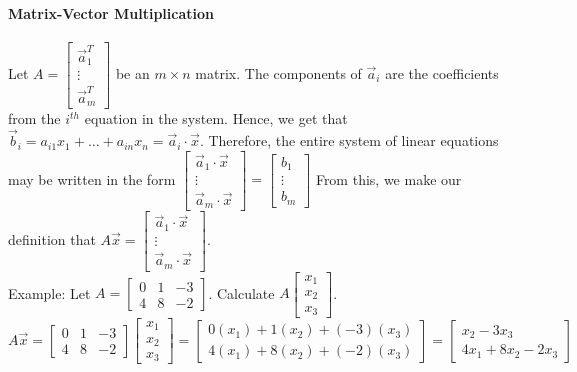 \documentclass[10pt,letter]{article}
\begin{document}
\paragraph{Matrix-Vector Multiplication} Let $A = \begin{bmatrix}\vec{a}_1^T\\\vdots\\\vec{a}_m^T\end{bmatrix}$ be an $m\times n$ matrix. The components of $\vec{a}_i$ are the coefficients from the $i^{th}$ equation in the system. Hence, we get that $\vec{b}_i=a_{i1}x_1+\ldots+a_{in}x_n=\vec{a}_i\cdot\vec{x}$. Therefore, the entire system of linear equations may be written in the form $\begin{bmatrix}\vec{a}_1\cdot\vec{x}\\\vdots\\\vec{a}_m\cdot\vec{x}\end{bmatrix}=\begin{bmatrix}b_1\\\vdots\\b_m\end{bmatrix}$ From this, we make our definition that $A\vec{x} = \begin{bmatrix}\vec{a}_1\cdot\vec{x}\\\vdots\\\vec{a}_m\cdot\vec{x}\end{bmatrix}$. \\ 
Example: Let $A = \begin{bmatrix}0&1&-3\\4&8&-2\end{bmatrix}$. Calculate $A\begin{bmatrix}x_1\\x_2\\x_3\end{bmatrix}$. \\ 
$$A\vec{x}=\begin{bmatrix}0&1&-3\\4&8&-2\end{bmatrix}\begin{bmatrix}x_1\\x_2\\x_3\end{bmatrix} = \begin{bmatrix}0(x_1)+1(x_2)+(-3)(x_3)\\4(x_1)+8(x_2)+(-2)(x_3)\end{bmatrix} = \begin{bmatrix}x_2-3x_3\\4x_1+8x_2-2x_3\end{bmatrix}$$ 
\end{document}
